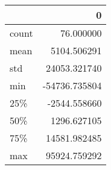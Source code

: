 \begin{tabular}{lr}
\toprule
{} &             0 \\
\midrule
count &     76.000000 \\
mean  &   5104.506291 \\
std   &  24053.321740 \\
min   & -54736.735804 \\
25\%   &  -2544.558660 \\
50\%   &   1296.627105 \\
75\%   &  14581.982485 \\
max   &  95924.759292 \\
\bottomrule
\end{tabular}
